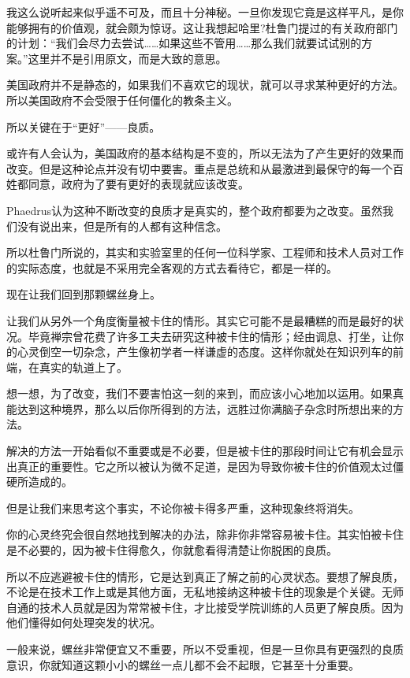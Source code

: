 \documentclass[UTF8]{article}
\begin{document}
\par 我这么说听起来似乎遥不可及，而且十分神秘。一旦你发现它竟是这样平凡，是你能够拥有的价值观，就会颇为惊讶。这让我想起哈里?杜鲁门提过的有关政府部门的计划：“我们会尽力去尝试……如果这些不管用……那么我们就要试试别的方案。”这里并不是引用原文，而是大致的意思。
\par 美国政府并不是静态的，如果我们不喜欢它的现状，就可以寻求某种更好的方法。所以美国政府不会受限于任何僵化的教条主义。
\par 所以关键在于“更好”——良质。
\par 或许有人会认为，美国政府的基本结构是不变的，所以无法为了产生更好的效果而改变。但是这种论点并没有切中要害。重点是总统和从最激进到最保守的每一个百姓都同意，政府为了要有更好的表现就应该改变。
\par Phaedrus认为这种不断改变的良质才是真实的，整个政府都要为之改变。虽然我们没有说出来，但是所有的人都有这种信念。
\par 所以杜鲁门所说的，其实和实验室里的任何一位科学家、工程师和技术人员对工作的实际态度，也就是不采用完全客观的方式去看待它，都是一样的。
\par 现在让我们回到那颗螺丝身上。
\par 让我们从另外一个角度衡量被卡住的情形。其实它可能不是最糟糕的而是最好的状况。毕竟禅宗曾花费了许多工夫去研究这种被卡住的情形；经由调息、打坐，让你的心灵倒空一切杂念，产生像初学者一样谦虚的态度。这样你就处在知识列车的前端，在真实的轨道上了。
\par 想一想，为了改变，我们不要害怕这一刻的来到，而应该小心地加以运用。如果真能达到这种境界，那么以后你所得到的方法，远胜过你满脑子杂念时所想出来的方法。
\par 解决的方法一开始看似不重要或是不必要，但是被卡住的那段时间让它有机会显示出真正的重要性。它之所以被认为微不足道，是因为导致你被卡住的价值观太过僵硬所造成的。
\par 但是让我们来思考这个事实，不论你被卡得多严重，这种现象终将消失。
\par 你的心灵终究会很自然地找到解决的办法，除非你非常容易被卡住。其实怕被卡住是不必要的，因为被卡住得愈久，你就愈看得清楚让你脱困的良质。
\par 所以不应逃避被卡住的情形，它是达到真正了解之前的心灵状态。要想了解良质，不论是在技术工作上或是其他方面，无私地接纳这种被卡住的现象是个关键。无师自通的技术人员就是因为常常被卡住，才比接受学院训练的人员更了解良质。因为他们懂得如何处理突发的状况。
\par 一般来说，螺丝非常便宜又不重要，所以不受重视，但是一旦你具有更强烈的良质意识，你就知道这颗小小的螺丝一点儿都不会不起眼，它甚至十分重要。
\end{document}
